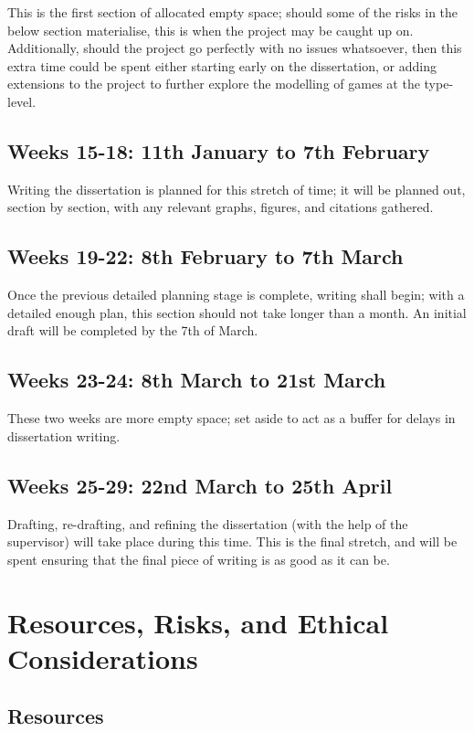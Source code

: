 \documentclass[12pt, a4paper]{scrartcl}
\begin{document}
This is the first section of allocated empty space; should some of the risks in the below section materialise, this is when the project may be caught up on. Additionally, should the project go perfectly with no issues whatsoever, then this extra time could be spent either starting early on the dissertation, or adding extensions to the project to further explore the modelling of games at the type-level.

\subsection{Weeks 15-18: 11th January to 7th February}

Writing the dissertation is planned for this stretch of time; it will be planned out, section by section, with any relevant graphs, figures, and citations gathered.

\subsection{Weeks 19-22: 8th February to 7th March}

Once the previous detailed planning stage is complete, writing shall begin; with a detailed enough plan, this section should not take longer than a month. An initial draft will be completed by the 7th of March.

\subsection{Weeks 23-24: 8th March to 21st March}

These two weeks are more empty space; set aside to act as a buffer for delays in dissertation writing.

\subsection{Weeks 25-29: 22nd March to 25th April}

Drafting, re-drafting, and refining the dissertation (with the help of the supervisor) will take place during this time. This is the final stretch, and will be spent ensuring that the final piece of writing is as good as it can be.

\section{Resources, Risks, and Ethical Considerations}

\subsection{Resources}
\end{document}
